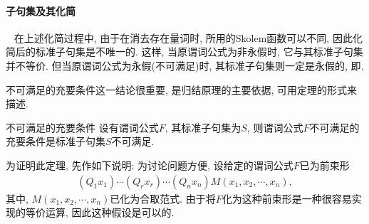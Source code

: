 \paragraph{子句集及其化简}~{}
在上述化简过程中, 由于在消去存在量词时, 所用的Skolem函数可以不同, 因此化简后的标准子句集是不唯一的.
这样, 当原谓词公式为非永假时, 它与其标准子句集并不等价. 但当原谓词公式为永假(不可满足)时, 其标准子句集则一定是永假的, 即.

不可满足的充要条件这一结论很重要, 是归结原理的主要依据, 可用定理的形式来描述.

\begin{mythm}{不可满足的充要条件}{}\label{AIthm3.1}
设有谓词公式$F$, 其标准子句集为$S$, 则谓词公式$F$不可满足的充要条件是标准子句集$S$不可满足.
\end{mythm}

为证明此定理, 先作如下说明:  为讨论问题方便, 设给定的谓词公式$F$已为前束形
\begin{align}
    (Q_1x_1)\cdots (Q_rx_r)\cdots (Q_nx_n)M(x_1,x_2,\cdots,x_n),
\end{align}
其中, $M(x_1,x_2,\cdots,x_n)$已化为合取范式. 由于将$F$化为这种前束形是一种很容易实现的等价运算, 因此这种假设是可以的.

